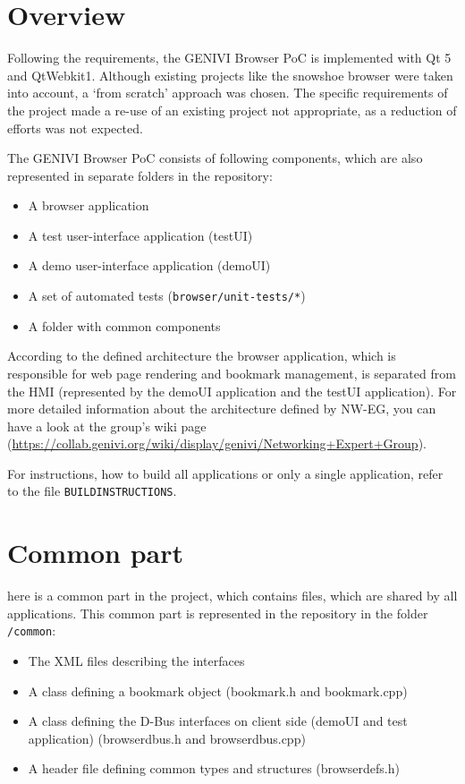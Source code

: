 \documentclass{pelagicore}
\begin{document}
\section{Overview}
Following the requirements, the GENIVI Browser PoC is implemented with Qt 5 and
\mbox{QtWebkit1}. Although existing projects like the snowshoe browser were taken
into account, a `from scratch' approach was chosen. The specific requirements
of the project made a re-use of an existing project not appropriate, as a
reduction of efforts was not expected.

The GENIVI Browser PoC consists of following components, which are also represented in
separate folders in the repository:

\begin{itemize}
    \item A browser application
    \item A test user-interface application (testUI)
    \item A demo user-interface application (demoUI)
    \item A set of automated tests ({\tt browser/unit-tests/*})
    \item A folder with common components
\end{itemize}

According to the defined architecture the browser application, which is
responsible for web page rendering and bookmark management, is separated from
the HMI (represented by the demoUI application and the testUI application). For
more detailed information about the architecture defined by NW-EG, you can have
a look at the group's wiki page
(\url{https://collab.genivi.org/wiki/display/genivi/Networking+Expert+Group}).

For instructions, how to build all applications or only a single application,
refer to the file {\tt BUILDINSTRUCTIONS}.

\section {Common part}
here is a common part in the project, which contains files, which are shared by
all applications. This common part is represented in the repository in the
folder {\tt /common}:

\begin{itemize}
    \item The XML files describing the interfaces
    \item A class defining a bookmark object (bookmark.h and bookmark.cpp)
    \item A class defining the D-Bus interfaces on client side (demoUI and test
          application) (browserdbus.h and browserdbus.cpp)
    \item A header file defining common types and structures (browserdefs.h)
\end{itemize}
\end{document}
